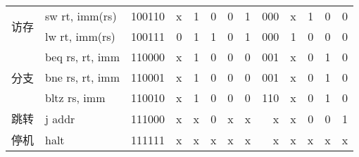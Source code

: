\begin{sidewaystable}[htbp]
\begin{tabular}{|c|l|l|r|r|r|p{1cm}|p{1cm}|r|r|r|r|r|}
    \hline
    \multirow{2}[4]{*}{访存} & sw rt, imm(rs) & 100110 & x     & 1     & 0     & 0     & 1     & 000   & x     & 1     & 0     & 0 \bigstrut\\
\cline{2-13}          & lw rt, imm(rs) & 100111 & 0     & 1     & 1     & 0     & 1     & 000   & 1     & 0     & 0     & 0 \bigstrut\\
    \hline
    \multirow{3}[6]{*}{分支} & beq rs, rt, imm & 110000 & x     & 1     & 0     & 0     & 0     & 001   & x     & 0     & 1     & 0 \bigstrut\\
\cline{2-13}          & bne rs, rt, imm & 110001 & x     & 1     & 0     & 0     & 0     & 001   & x     & 0     & 1     & 0 \bigstrut\\
\cline{2-13}          & bltz rs, imm & 110010 & x     & 1     & 0     & 0     & 0     & 110   & x     & 0     & 1     & 0 \bigstrut\\
    \hline
    跳转    & j addr & 111000 & x     & x     & 0     & x     & x     & x     & x     & 0     & 0     & 1 \bigstrut\\
    \hline
    停机    & halt  & 111111 & x     & x     & x     & x     & x     & x     & x     & x     & x     & x \bigstrut\\
    \hline
    \end{tabular}%
  \label{tab:control_codes}%
\end{sidewaystable}%